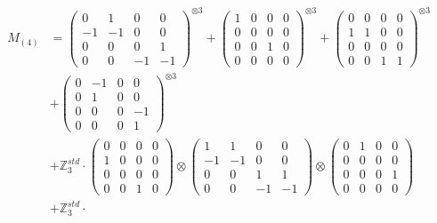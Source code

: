 \documentclass{article}
\newcommand{\Mthree}{%
    M_{(4)}
}
\begin{document}
        \footnotesize{
        \begin{align}
        \Mthree
        &= \label{Rs4-Rc15-Solution-1-c1} \begin{pmatrix} 0 & 1 & 0 & 0 \\ -1 & -1 & 0 & 0 \\ 0 & 0 & 0 & 1 \\ 0 & 0 & -1 & -1 \end{pmatrix}^{\otimes 3} 
            + \begin{pmatrix} 1 & 0 & 0 & 0 \\ 0 & 0 & 0 & 0 \\ 0 & 0 & 1 & 0 \\ 0 & 0 & 0 & 0 \end{pmatrix}^{\otimes 3} 
            + \begin{pmatrix} 0 & 0 & 0 & 0 \\ 1 & 1 & 0 & 0 \\ 0 & 0 & 0 & 0 \\ 0 & 0 & 1 & 1 \end{pmatrix}^{\otimes 3} \\
        &+ \label{Rs4-Rc15-Solution-1-c4} \begin{pmatrix} 0 & -1 & 0 & 0 \\ 0 & 1 & 0 & 0 \\ 0 & 0 & 0 & -1 \\ 0 & 0 & 0 & 1 \end{pmatrix}^{\otimes 3} \\
        &+ \label{Rs4-Rc15-Solution-1-c5} \mathbb{Z}_3^{std} \cdot 
            \begin{pmatrix} 0 & 0 & 0 & 0 \\ 1 & 0 & 0 & 0 \\ 0 & 0 & 0 & 0 \\ 0 & 0 & 1 & 0 \end{pmatrix} \otimes 
            \begin{pmatrix} 1 & 1 & 0 & 0 \\ -1 & -1 & 0 & 0 \\ 0 & 0 & 1 & 1 \\ 0 & 0 & -1 & -1 \end{pmatrix} \otimes 
            \begin{pmatrix} 0 & 1 & 0 & 0 \\ 0 & 0 & 0 & 0 \\ 0 & 0 & 0 & 1 \\ 0 & 0 & 0 & 0 \end{pmatrix} \\ 
        &+ \label{Rs4-Rc15-Solution-1-c6} \mathbb{Z}_3^{std} \cdot 

\end{align}}
\end{document}

